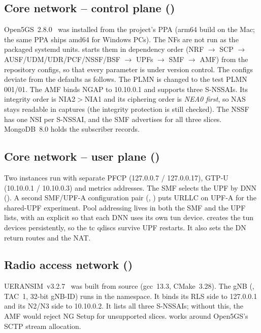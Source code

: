 \subsection{Core network -- control plane (\memberA)}
Open5GS~2.8.0~\cite{open5gs} was installed from the project's PPA (arm64 build on the Mac; the same PPA ships amd64 for Windows PCs). The NFs are
not run as the packaged systemd units.  starts them in dependency order
(NRF $\rightarrow$ SCP $\rightarrow$ AUSF/UDM/UDR/PCF/NSSF/BSF $\rightarrow$ UPFs
$\rightarrow$ SMF $\rightarrow$ AMF) from the repository configs, so that every parameter is
under version control. The configs deviate from the defaults as follows. The PLMN is changed
to the test PLMN 001/01. The AMF binds NGAP to 10.10.0.1 and supports three S-NSSAIs. Its
integrity order is NIA2$>$NIA1 and its ciphering order is \emph{NEA0 first}, so NAS stays
readable in captures (the integrity protection is still checked). The NSSF has one NSI per
S-NSSAI, and the SMF advertises  for all three slices. MongoDB~8.0 holds
the subscriber records.

\subsection{Core network -- user plane (\memberB)}
Two  instances run with separate PFCP (127.0.0.7 / 127.0.0.17), GTP-U
(10.10.0.1 / 10.10.0.3) and metrics addresses. The SMF selects the UPF by DNN
(). A second SMF/UPF-A configuration pair (,
) puts URLLC on UPF-A for the shared-UPF experiment. Pool addressing
lives in both the SMF and the UPF  lists, with an explicit  so that
each DNN uses its own tun device.  creates the tun devices persistently, so
the tc qdiscs survive UPF restarts. It also sets the DN return routes and the NAT.

\subsection{Radio access network (\memberC)}
UERANSIM~v3.2.7~\cite{ueransim} was built from source (gcc~13.3, CMake~3.28). The gNB
(, TAC~1, 32-bit gNB-ID) runs in the  namespace. It binds its RLS
side to 127.0.0.1 and its N2/N3 side to 10.10.0.2. It lists all three S-NSSAIs; without
this, the AMF would reject NG Setup for unsupported slices.  works
around Open5GS's SCTP stream allocation.

